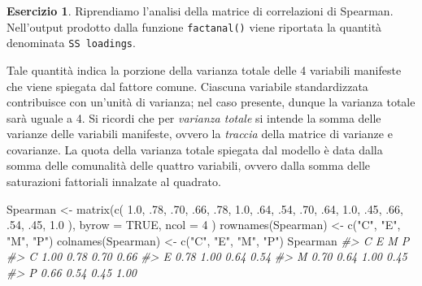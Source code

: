\documentclass[
  11pt,
]{krantz}
\makeatletter
\newenvironment{Shaded}{\begin{snugshade}}{\end{snugshade}}
\newcommand{\AttributeTok}[1]{\textcolor[rgb]{0.61,0.61,0.61}{#1}}
\newcommand{\CommentTok}[1]{\textcolor[rgb]{0.37,0.37,0.37}{\textit{#1}}}
\newcommand{\ConstantTok}[1]{\textcolor[rgb]{0,0,0}{#1}}
\newcommand{\DecValTok}[1]{\textcolor[rgb]{0.06,0.06,0.06}{#1}}
\newcommand{\FloatTok}[1]{\textcolor[rgb]{0.06,0.06,0.06}{#1}}
\newcommand{\FunctionTok}[1]{\textcolor[rgb]{0,0,0}{#1}}
\newcommand{\NormalTok}[1]{#1}
\newcommand{\OtherTok}[1]{\textcolor[rgb]{0.37,0.37,0.37}{#1}}
\newcommand{\StringTok}[1]{\textcolor[rgb]{0.5,0.5,0.5}{#1}}
\newenvironment{kframe}{%
\medskip{}
\setlength{\fboxsep}{.8em}
 \def\at@end@of@kframe{}%
 \ifinner\ifhmode%
  \def\at@end@of@kframe{\end{minipage}}%
  \begin{minipage}{\columnwidth}%
 \fi\fi%
 \def\FrameCommand##1{\hskip\@totalleftmargin \hskip-\fboxsep
 \colorbox{shadecolor}{##1}\hskip-\fboxsep
     \hskip-\linewidth \hskip-\@totalleftmargin \hskip\columnwidth}%
 \MakeFramed {\advance\hsize-\width
   \@totalleftmargin\z@ \linewidth\hsize
   \@setminipage}}%
 {\par\unskip\endMakeFramed%
 \at@end@of@kframe}
\renewenvironment{Shaded}{\begin{kframe}}{\end{kframe}}
\theoremstyle{definition}
\theoremstyle{definition}
\theoremstyle{definition}
\newtheorem{exercise}{Esercizio}[chapter]
\theoremstyle{definition}
\theoremstyle{remark}
\makeatother
\begin{document}
\begin{exercise}
Riprendiamo l'analisi della matrice di correlazioni di Spearman. Nell'output prodotto dalla funzione \texttt{factanal()} viene riportata la quantità denominata \texttt{SS\ loadings}.

Tale quantità indica la porzione della varianza totale delle 4 variabili manifeste che viene spiegata dal fattore comune. Ciascuna variabile standardizzata contribuisce con un'unità di varianza; nel caso presente, dunque la varianza totale sarà uguale a 4. Si ricordi che per \emph{varianza totale} si intende la somma delle varianze delle variabili manifeste, ovvero la \emph{traccia} della matrice di varianze e covarianze. La quota della varianza totale spiegata dal modello è data dalla somma delle comunalità delle quattro variabili, ovvero dalla somma delle saturazioni fattoriali innalzate al quadrato.

\begin{Shaded}
\begin{Highlighting}[]
\NormalTok{Spearman }\OtherTok{\textless{}{-}} \FunctionTok{matrix}\NormalTok{(}\FunctionTok{c}\NormalTok{(}
  \FloatTok{1.0}\NormalTok{, .}\DecValTok{78}\NormalTok{, .}\DecValTok{70}\NormalTok{, .}\DecValTok{66}\NormalTok{,}
\NormalTok{  .}\DecValTok{78}\NormalTok{, }\FloatTok{1.0}\NormalTok{, .}\DecValTok{64}\NormalTok{, .}\DecValTok{54}\NormalTok{,}
\NormalTok{  .}\DecValTok{70}\NormalTok{, .}\DecValTok{64}\NormalTok{, }\FloatTok{1.0}\NormalTok{, .}\DecValTok{45}\NormalTok{,}
\NormalTok{  .}\DecValTok{66}\NormalTok{, .}\DecValTok{54}\NormalTok{, .}\DecValTok{45}\NormalTok{, }\FloatTok{1.0}
\NormalTok{),}
\AttributeTok{byrow =} \ConstantTok{TRUE}\NormalTok{, }\AttributeTok{ncol =} \DecValTok{4}
\NormalTok{)}
\FunctionTok{rownames}\NormalTok{(Spearman) }\OtherTok{\textless{}{-}} \FunctionTok{c}\NormalTok{(}\StringTok{"C"}\NormalTok{, }\StringTok{"E"}\NormalTok{, }\StringTok{"M"}\NormalTok{, }\StringTok{"P"}\NormalTok{)}
\FunctionTok{colnames}\NormalTok{(Spearman) }\OtherTok{\textless{}{-}} \FunctionTok{c}\NormalTok{(}\StringTok{"C"}\NormalTok{, }\StringTok{"E"}\NormalTok{, }\StringTok{"M"}\NormalTok{, }\StringTok{"P"}\NormalTok{)}
\NormalTok{Spearman}
\CommentTok{\#\textgreater{}      C    E    M    P}
\CommentTok{\#\textgreater{} C 1.00 0.78 0.70 0.66}
\CommentTok{\#\textgreater{} E 0.78 1.00 0.64 0.54}
\CommentTok{\#\textgreater{} M 0.70 0.64 1.00 0.45}
\CommentTok{\#\textgreater{} P 0.66 0.54 0.45 1.00}
\end{Highlighting}
\end{Shaded}


\end{exercise}
\end{document}
